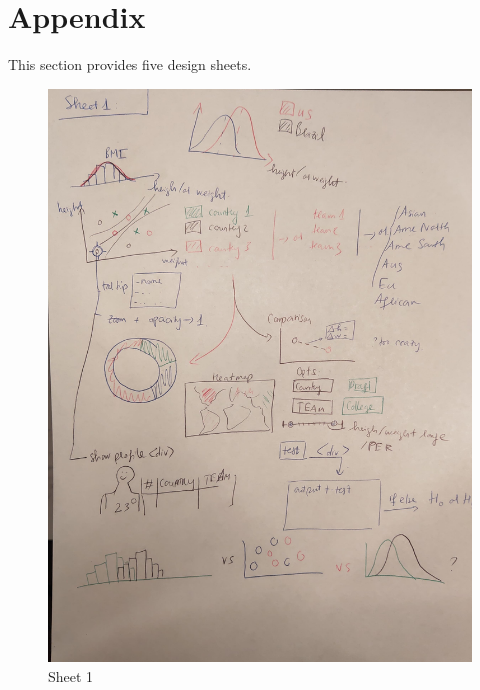 \documentclass[a4paper,12pt,twoside]{article}
\numberwithin{equation}{section}
\begin{document}
\section{Appendix}

This section provides five design sheets.
\begin{figure}[h]
\caption{Sheet 1}
\includegraphics[scale=0.15]{o1.jpg}
\centering
\end{figure}
\end{document}
